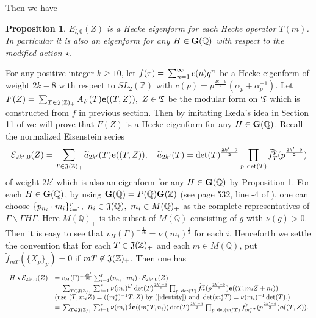 \documentclass[11pt]{amsart}
\numberwithin{equation}{section}
\newtheorem{prop}[theorem]{Proposition}
\theoremstyle{definition}
\begin{document}
Then we have
\begin{prop}\label{eisen-hecke} $E_{l,0}(Z)$ is a Hecke eigenform for each Hecke operator $T(m)$. 
In particular it is also an eigenform for any $H\in \bold G({\mathbb{Q}})$ with respect to the modified action $\star$. 
\end{prop}

For any positive integer $k\ge 10$, let $f(\tau)={\displaystyle}\sum_{n=1}^\infty c(n)q^n$ be a Hecke eigenform of 
weight $2k-8$ with respect to $SL_2({\mathbb{Z}})$ with 
$c(p)=p^{\frac{2k-9}{2}}(\alpha_p+\alpha^{-1}_p)$. Let $F(Z)={\displaystyle}\sum_{T\in \frak J({\mathbb{Z}})_+} A_F(T)\bold e((T,Z)),\ Z\in \frak T$ be the modular form on $\frak T$ which is constructed from $f$ in 
previous section. Then by imitating Ikeda's idea in Section 11 of \cite{Ik3} we will prove that 
$F(Z)$ is 
a Hecke eigenform for any $H\in \bold G({\mathbb{Q}})$. 
Recall the normalized Eisenstein series $$\mathcal{E}_{2k',0}(Z)=
\sum_{T\in \frak J({\mathbb{Z}})_+}\widetilde{a}_{2k'}(T)\bold{e}((T,Z)),\quad 
\widetilde{a}_{2k'}(T)=\det(T)^{\frac{2k'-9}{2}}\prod_{p|\det(T)}\widetilde{f}^p_T(p^{\frac{2k'-9}{2}})$$ of weight $2k'$ which is also 
an eigenform for any $H\in \bold G({\mathbb{Q}})$ by Proposition \ref{eisen-hecke}. 
For each $H\in \bold G({\mathbb{Q}})$, by using $\bold G({\mathbb{Q}})=P({\mathbb{Q}})\bold G({\mathbb{Z}})$ (see page 532, line -4 of \cite{B}), 
one can choose $\{p_{n_i}\cdot m_i\}_{i=1}^r,\ n_i\in \frak J({\mathbb{Q}}),\ m_i\in M({\mathbb{Q}})_+$ as the complete representatives of 
$\Gamma\backslash\Gamma H\Gamma$. Here $M({\mathbb{Q}})_+$ is the subset of $M({\mathbb{Q}})$ consisting of $g$ with $\nu(g)>0$. 
Then it is easy to see that $v_H(\Gamma)^{-\frac{1}{36}}=\nu(m_i)^{\frac{1}{2}}$ for each $i$.
Henceforth we settle the convention that 
for each $T\in \frak J({\mathbb{Z}})_+$ and each $m\in M({\mathbb{Q}})$,  put 
$\widetilde{f}_{mT}(\{X_p\}_p)=0$ if $mT\not\in \frak J({\mathbb{Z}})_+$.  
Then one has 
$$\begin{array}{ll}
H\star \mathcal{E}_{2k',0}(Z)&=v_H(\Gamma)^{-\frac{2k'}{36}}{\displaystyle}\sum_{i=1}^r (p_{n_i}\cdot m_i)\cdot \mathcal{E}_{2k',0}(Z)\\
&=
{\displaystyle}\sum_{T\in \frak J({\mathbb{Z}})_+} \sum_{i=1}^r\nu(m_i)^{k'} \det(T)^{\frac{2k'-9}{2}}
\prod_{p|\det(T)}\widetilde{f}^p_T(p^{\frac{2k'-9}{2}}) \bold e((T,m_i Z+n_i))\\
&({\rm use}\ (T,m_iZ)=((m^\ast_i)^{-1}T,Z)\ {\rm by}\ (\ref{identity})\ {\rm and}\ \det(m^\ast_iT)=\nu(m_i)^{-1}\det(T).)  \\
&=
{\displaystyle}\sum_{T\in \frak J({\mathbb{Z}})_+} \sum_{i=1}^r\nu(m_i)^{\frac{9}{2}} \bold e((m^\ast_i T,n_i))
\det(T)^{\frac{2k'-9}{2}}\prod_{p|\det(m^\ast_i T)}\widetilde{f}^p_{m^\ast_i T}(p^{\frac{2k'-9}{2}}) \bold e((T,Z)). 
\end{array}$$
\end{document}
